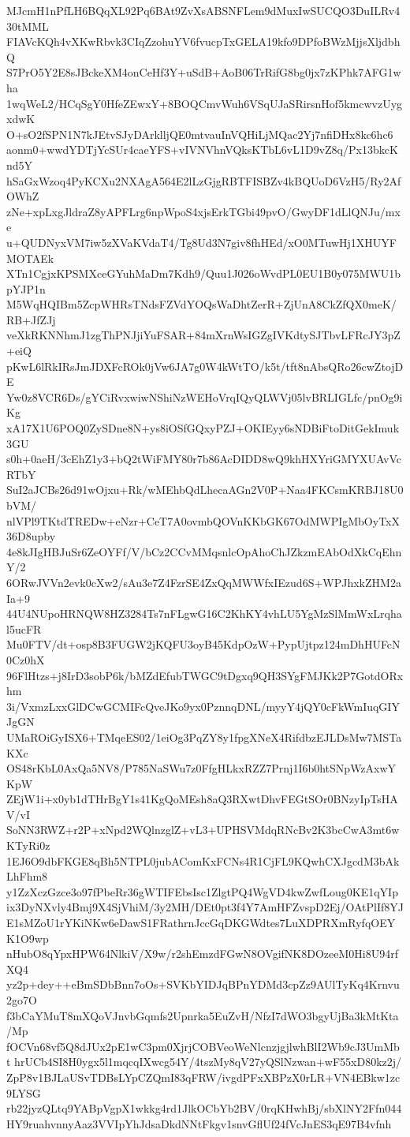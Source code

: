 MJcmH1nPfLH6BQqXL92Pq6BAt9ZvXsABSNFLem9dMuxIwSUCQO3DuILRv430tMML
FIAVcKQh4vXKwRbvk3CIqZzohuYV6fvucpTxGELA19kfo9DPfoBWzMjjsXljdbhQ
S7PrO5Y2E8sJBckeXM4onCeHf3Y+uSdB+AoB06TrRifG8bg0jx7zKPhk7AFG1wha
1wqWeL2/HCqSgY0HfeZEwxY+8BOQCmvWuh6VSqUJaSRirsnHof5kmcwvzUygxdwK
O+sO2fSPN1N7kJEtvSJyDArklljQE0mtvauInVQHiLjMQac2Yj7nfiDHx8kc6hc6
aonm0+wwdYDTjYcSUr4caeYFS+vIVNVhnVQksKTbL6vL1D9vZ8q/Px13bkcKnd5Y
hSaGxWzoq4PyKCXu2NXAgA564E2lLzGjgRBTFISBZv4kBQUoD6VzH5/Ry2AfOWhZ
zNe+xpLxgJldraZ8yAPFLrg6npWpoS4xjsErkTGbi49pvO/GwyDF1dLlQNJu/mxe
u+QUDNyxVM7iw5zXVaKVdaT4/Tg8Ud3N7giv8fhHEd/xO0MTuwHj1XHUYFMOTAEk
XTn1CgjxKPSMXceGYuhMaDm7Kdh9/Quu1J026oWvdPL0EU1B0y075MWU1bpYJP1n
M5WqHQIBm5ZcpWHRsTNdsFZVdYOQsWaDhtZerR+ZjUnA8CkZfQX0meK/RB+JfZJj
veXkRKNNhmJ1zgThPNJjiYuFSAR+84mXrnWsIGZgIVKdtySJTbvLFRcJY3pZ+eiQ
pKwL6lRkIRsJmJDXFcROk0jVw6JA7g0W4kWtTO/k5t/tft8nAbsQRo26cwZtojDE
Yw0z8VCR6Ds/gYCiRvxwiwNShiNzWEHoVrqIQyQLWVj05lvBRLIGLfc/pnOg9iKg
xA17X1U6POQ0ZySDne8N+ys8iOSfGQxyPZJ+OKIEyy6sNDBiFtoDitGekImuk3GU
s0h+0aeH/3cEhZ1y3+bQ2tWiFMY80r7b86AcDIDD8wQ9khHXYriGMYXUAvVcRTbY
SuI2aJCBs26d91wOjxu+Rk/wMEhbQdLhecaAGn2V0P+Naa4FKCsmKRBJ18U0bVM/
nlVPl9TKtdTREDw+eNzr+CeT7A0ovmbQOVnKKbGK67OdMWPIgMbOyTxX36D8upby
4e8kJIgHBJuSr6ZeOYFf/V/bCz2CCvMMqsnlcOpAhoChJZkzmEAbOdXkCqEhnY/2
6ORwJVVn2evk0cXw2/sAu3e7Z4FzrSE4ZxQqMWWfxIEzud6S+WPJhxkZHM2aIa+9
44U4NUpoHRNQW8HZ3284Ts7nFLgwG16C2KhKY4vhLU5YgMzSlMmWxLrqhal5ucFR
Mu0FTV/dt+osp8B3FUGW2jKQFU3oyB45KdpOzW+PypUjtpz124mDhHUFcN0Cz0hX
96FlHtzs+j8IrD3sobP6k/bMZdEfubTWGC9tDgxq9QH3SYgFMJKk2P7GotdORxhm
3i/VxmzLxxGlDCwGCMIFcQveJKo9yx0PznnqDNL/myyY4jQY0cFkWmIuqGIYJgGN
UMaROiGyISX6+TMqeES02/1eiOg3PqZY8y1fpgXNeX4RifdbzEJLDsMw7MSTaKXc
OS48rKbL0AxQa5NV8/P785NaSWu7z0FfgHLkxRZZ7Prnj1I6b0htSNpWzAxwYKpW
ZEjW1i+x0yb1dTHrBgY1s41KgQoMEsh8aQ3RXwtDhvFEGtSOr0BNzyIpTsHAV/vI
SoNN3RWZ+r2P+xNpd2WQlnzglZ+vL3+UPHSVMdqRNcBv2K3bcCwA3mt6wKTyRi0z
1EJ6O9dbFKGE8qBh5NTPL0jubAComKxFCNs4R1CjFL9KQwhCXJgcdM3bAkLhFhm8
y1ZzXczGzce3o97fPbeRr36gWTIFEbsIsc1ZlgtPQ4WgVD4kwZwfLoug0KE1qYIp
ix3DyNXvly4Bmj9X4SjVhiM/3y2MH/DEt0pt3f4Y7AmHFZvspD2Ej/OAtPlIf8YJ
E1sMZoU1rYKiNKw6eDawS1FRathrnJccGqDKGWdtes7LuXDPRXmRyfqOEYK1O9wp
nHubO8qYpxHPW64NlkiV/X9w/r2shEmzdFGwN8OVgifNK8DOzeeM0Hi8U94rfXQ4
yz2p+dey++eBmSDbBnn7oOs+SVKbYIDJqBPnYDMd3cpZz9AUlTyKq4Krnvu2go7O
f3bCaYMuT8mXQoVJnvbGqmfs2Upnrka5EuZvH/NfzI7dWO3bgyUjBa3kMtKta/Mp
fOCVn68vf5Q8dJUx2pE1wC3pm0XjrjCOBVeoWeNlcnzjgjlwhBlI2Wb9cJ3UmMbt
hrUCb4SI8H0ygx5l1mqcqIXwcg54Y/4tszMy8qV27yQSlNzwan+wF55xD80kz2j/
ZpP8v1BJLaUSvTDBsLYpCZQmI83qFRW/ivgdPFxXBPzX0rLR+VN4EBkw1zc9LYSG
rb22jyzQLtq9YABpVgpX1wkkg4rd1JlkOCbYb2BV/0rqKHwhBj/sbXlNY2Ffn044
HY9ruahvnnyAaz3VVIpYhJdsaDkdNNtFkgv1snvGflUf24fVcJnES3qE97B4vfnh
